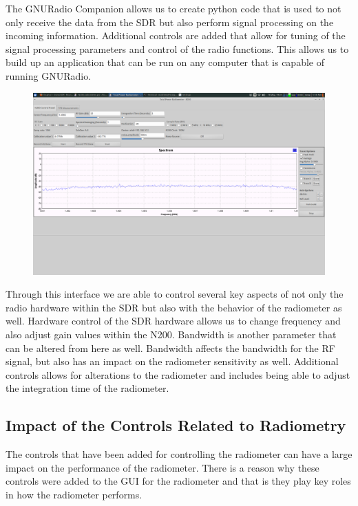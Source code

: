 The GNURadio Companion allows us to create python code that is used to not only receive the data from the SDR but also perform signal processing on the incoming information.  Additional controls are added that allow for tuning of the signal processing parameters and control of the radio functions.  This allows us to build up an application that can be run on any computer that is capable of running GNURadio.  

{\begin{figure}[h!tb] 
\centering
\includegraphics[width=17cm]{Images/radiometer_gui.png}
\label{radiometer_gui}
\end{figure}
}

Through this interface we are able to control several key aspects of not only the radio hardware within the SDR but also with the behavior of the radiometer as well.  Hardware control of the SDR hardware allows us to change frequency and also adjust gain values within the N200.  Bandwidth is another parameter that can be altered from here as well.  Bandwidth affects the bandwidth for the RF signal, but also has an impact on the radiometer sensitivity as well.  Additional controls allows for alterations to the radiometer and includes being able to adjust the integration time of the radiometer.  

\subsection{Impact of the Controls Related to Radiometry}

The controls that have been added for controlling the radiometer can have a large impact on the performance of the radiometer.  There is a reason why these controls were added to the GUI for the radiometer and that is they play key roles in how the radiometer performs.  

